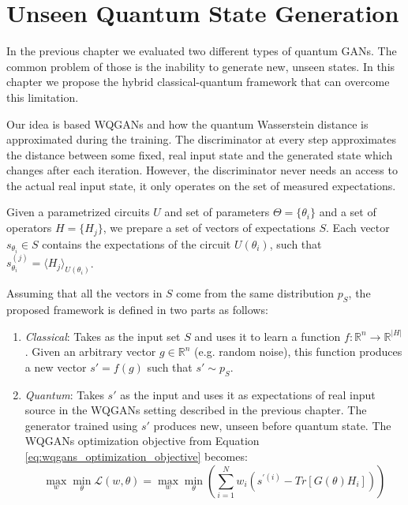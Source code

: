 \chapter{Unseen Quantum State Generation}
\label{chapter:my_contribution}
In the previous chapter we evaluated two different types of quantum GANs. The
common problem of those is the inability to generate new, unseen states. In this
chapter we propose the hybrid classical-quantum framework that can overcome this limitation. 

Our idea is based WQGANs and how the quantum Wasserstein distance is
approximated during the training. The discriminator at every step approximates
the distance between some fixed, real input state and the generated state which
changes after each iteration. However, the discriminator never needs an access to
the actual real input state, it only operates on the set of measured
expectations. 

Given a parametrized circuits $U$
and set of parameters $\Theta = \{\theta_i\}$ and a set of operators $H =
\{H_j\}$, we prepare a set of vectors of expectations $S$. Each vector $s_{\theta_i}
\in S$ contains the expectations of the circuit $U(\theta_i)$, such that
$s_{\theta_i}^{(j)} = \langle H_j \rangle_{U(\theta_i)} $.

Assuming that all the vectors in $S$ come from the same distribution $p_S$,
the proposed framework is defined in two parts as follows:
\begin{enumerate}
\item \textit{Classical}: Takes as the input set $S$ and uses it to learn a function $f:
  \mathbb{R}^{n} \to \mathbb{R}^{|H|}$. Given an arbitrary vector $g \in
  \mathbb{R}^n$ (e.g. random noise), this function produces a new vector $s' =
  f(g)$ such that $s' \sim p_S$.  
\item \textit{Quantum}: Takes $s'$ as the input and uses it as
  expectations of real input source in the WQGANs setting described in the
  previous chapter. The generator trained using $s'$ produces new, unseen before
  quantum state. The WQGANs optimization objective from Equation
  \ref{eq:wqgans_optimization_objective} becomes:
  \begin{equation}
    \max_{w}{\min_{\theta}{\mathcal{L}(w, \theta)}} = \max_{w}{\min_{\theta}{(\sum_{i=1}^Nw_i(s^{\prime(i)} - Tr[G(\theta)H_i]))}} 
    \label{eq:wqgans_optimization_objective_unseen}
  \end{equation}
\end{enumerate}

